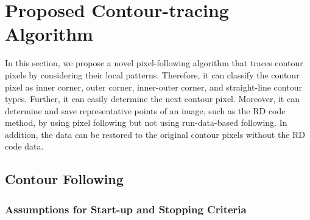 
\section{Proposed Contour-tracing Algorithm}


In this section, we propose a novel pixel-following algorithm that traces contour pixels by considering their local patterns. Therefore, it can classify the contour pixel as inner corner, outer corner, inner-outer corner, and straight-line contour types. Further, it can easily determine the next contour pixel. Moreover, it can determine and save representative points of an image, such as the RD code method, by using pixel following but not using run-data-based following. In addition, the data can be restored to the original contour pixels without the RD code data.

\subsection{Contour Following}

\subsubsection{Assumptions for Start-up and Stopping Criteria}


